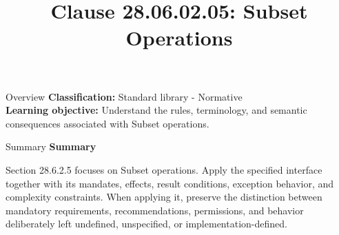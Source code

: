 \documentclass[10pt,letterpaper]{article}
\title{Clause 28.06.02.05: Subset Operations}
\author{}
\date{}
\begin{document}
\maketitle
\begin{CornellOverviewBox}{Overview}
\textbf{Classification:} Standard library - Normative\\[2pt]
\textbf{Learning objective:} Understand the rules, terminology, and semantic consequences associated with Subset operations.
\end{CornellOverviewBox}\begin{CornellSummaryBox}{Summary}
{\sffamily\bfseries\color{Accent} Summary}\par\vspace{3pt}Section 28.6.2.5 focuses on Subset operations. Apply the specified interface together with its mandates, effects, result conditions, exception behavior, and complexity constraints. When applying it, preserve the distinction between mandatory requirements, recommendations, permissions, and behavior deliberately left undefined, unspecified, or implementation-defined.
\end{CornellSummaryBox}
\end{document}
